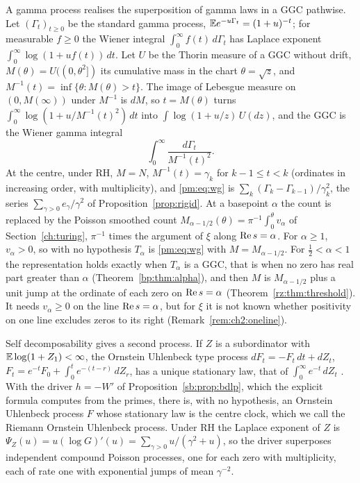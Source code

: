 A gamma process realises the superposition of gamma laws in a GGC pathwise. Let $(\Gamma_t)_{t\ge0}$ be the standard gamma process, $\mathbb{E} e^{-u\Gamma_t}=(1+u)^{-t}$; for measurable $f\ge0$ the Wiener integral $\int_0^\infty f(t)\,d\Gamma_t$ has Laplace exponent $\int_0^\infty\log(1+uf(t))\,dt$. Let $U$ be the Thorin measure of a GGC without drift, $M(\theta)=U((0,\theta^2])$ its cumulative mass in the chart $\theta=\sqrt z$, and $M^{-1}(t)=\inf\{\theta:M(\theta)>t\}$. The image of Lebesgue measure on $(0,M(\infty))$ under $M^{-1}$ is $dM$, so $t=M(\theta)$ turns $\int_0^\infty\log(1+u/M^{-1}(t)^2)\,dt$ into $\int\log(1+u/z)\,U(dz)$, and the GGC is the Wiener gamma integral \cite{JRY}
\begin{equation}\label{pm:eq:wg}
\int_0^\infty\frac{d\Gamma_t}{M^{-1}(t)^2}.
\end{equation}
At the centre, under RH, $M=N$, $M^{-1}(t)=\gamma_k$ for $k-1\le t<k$ (ordinates in increasing order, with multiplicity), and \eqref{pm:eq:wg} is $\sum_k(\Gamma_k-\Gamma_{k-1})/\gamma_k^2$, the series $\sum_{\gamma>0}e_\gamma/\gamma^2$ of Proposition~\ref{prop:rigid}. At a basepoint $\alpha$ the count is replaced by the Poisson smoothed count $M_{\alpha-1/2}(\theta)=\pi^{-1}\int_0^\theta v_\alpha$ of Section~\ref{ch:turing}, $\pi^{-1}$ times the argument of $\xi$ along $\operatorname{Re} s=\alpha$. For $\alpha\ge1$, $v_\alpha>0$, so with no hypothesis $T_\alpha$ is \eqref{pm:eq:wg} with $M=M_{\alpha-1/2}$. For $\frac12<\alpha<1$ the representation holds exactly when $T_\alpha$ is a GGC, that is when no zero has real part greater than $\alpha$ (Theorem~\ref{bp:thm:alpha}), and then $M$ is $M_{\alpha-1/2}$ plus a unit jump at the ordinate of each zero on $\operatorname{Re} s=\alpha$ (Theorem~\ref{rz:thm:threshold}). It needs $v_\alpha\ge0$ on the line $\operatorname{Re} s=\alpha$, but for $\xi$ it is not known whether positivity on one line excludes zeros to its right (Remark~\ref{rem:ch2:oneline}).

Self decomposability gives a second process. If $Z$ is a subordinator with $\mathbb{E}\log(1+Z_1)<\infty$, the Ornstein Uhlenbeck type process $dF_t=-F_t\,dt+dZ_t$, $F_t=e^{-t}F_0+\int_0^te^{-(t-r)}\,dZ_r$, has a unique stationary law, that of $\int_0^\infty e^{-t}\,dZ_t$ \cite[Theorem 17.5 and Corollary 17.9]{Sato99}. With the driver $h=-W'$ of Proposition~\ref{sb:prop:bdlp}, which the explicit formula computes from the primes, there is, with no hypothesis, an Ornstein Uhlenbeck process $F$ whose stationary law is the centre clock, which we call the Riemann Ornstein Uhlenbeck process. Under RH the Laplace exponent of $Z$ is $\Psi_Z(u)=u(\log G)'(u)=\sum_{\gamma>0}u/(\gamma^2+u)$, so the driver superposes independent compound Poisson processes, one for each zero with multiplicity, each of rate one with exponential jumps of mean $\gamma^{-2}$.

